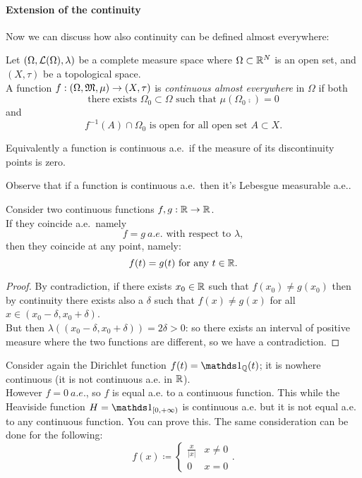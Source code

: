 \paragraph{Extension of the continuity} Now we can discuss how also continuity can be defined almost everywhere:
\begin{defn}\label{def:continuity-almost-everywhere}
	Let $(\Omega, \mathcal L(\Omega),\lambda)$ be a complete measure space where $\Omega \subset \mathbb R^N$ is an open set, and $(X,\tau)$ be a topological space.\\
	A function $f:(\Omega, \mathfrak M, \mu) \to (X,\tau)$ is \emph{continuous almost everywhere} in $\Omega$ if both
	$$
		\text{there exists } \Omega_0 
		\subset \Omega 
		\text{ such that } \mu(\Omega_0\comp)
		= 0
	$$
	and
	$$
		f^{-1}(A) \cap \Omega_0 
		\text{  is open for all open set } A 
		\subset X
	.
	$$
\end{defn}
Equivalently a function is continuous a.e.\ if the measure of its discontinuity points is zero.

Observe that if a function is continuous a.e.\ then it's Lebesgue measurable a.e..

\begin{prop}
	Consider two continuous functions $f,g: \mathbb R \to \mathbb R$.\\
	If they coincide a.e.\,
	namely
	$$
		f
		=g 
		\ a.e.
		\text{ with respect to } \lambda
	,
	$$
	then they coincide at any point,
	namely:
	$$
		f(t)
		= g(t) 
		\text{ for any } 
		t \in \mathbb R
	.
	$$
\end{prop}
\begin{proof}
	By contradiction, if there exists $x_0 \in \mathbb R$ such that $f(x_0)\neq g(x_0)$
	then by continuity there exists also a $\delta$ such that
	$f(x) \neq g(x)$
	for all $x \in (x_0 - \delta, x_0 + \delta)$.\\
	But then $\lambda((x_0-\delta,x_0+\delta))=2\delta>0$:
	so there exists an interval of positive measure where the two functions are different, so we have a contradiction.
\end{proof}

\begin{exam}
	Consider again the Dirichlet function $f(t)=\Ind_\QQ(t)$; it is nowhere continuous (it is not continuous a.e. in $\mathbb R$).\\
	However $f = 0 \ a.e.$, so $f$ is equal a.e. to a continuous function. This while the Heaviside function $H = \Ind_{[0,+\infty)}$ is continuous a.e. but it is not equal a.e. to any continuous function. You can prove this. The same consideration can be done for the following: 
	$$
		f(x) 
		\coloneqq \begin{cases}
			\frac x{|x|} & x \neq 0 \\ 0 & x=0
			\end{cases}
	.
	$$
\end{exam}


